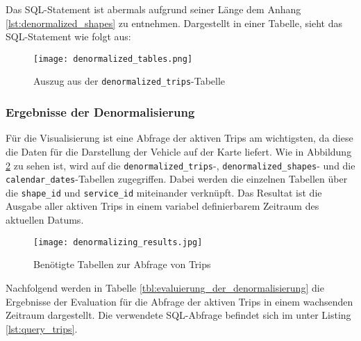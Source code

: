     Das SQL-Statement ist abermals aufgrund seiner Länge dem Anhang \ref{lst:denormalized_shapes} zu entnehmen. Dargestellt in einer Tabelle, sieht das SQL-Statement wie folgt aus:

    \begin{figure}[htbp]
      \begin{center}
        \texttt{[image: denormalized\_tables.png]}
        \caption{Auszug aus der \texttt{denormalized\_trips}-Tabelle}
        \label{fig:denormalized_table}
      \end{center}
    \end{figure}  

    \subsubsection*{Ergebnisse der Denormalisierung}
    \label{ssub:ergebnisse_der_denormalisierung}
      Für die Visualisierung ist eine Abfrage der aktiven Trips am wichtigsten, da diese die Daten für die Darstellung der Vehicle auf der Karte liefert. Wie in Abbildung \ref{fig:denormalizing_results} zu sehen ist, wird auf die \texttt{denormalized\_trips}-, \texttt{denormalized\_shapes}- und die \texttt{calendar\_dates}-Tabellen zugegriffen. Dabei werden die einzelnen Tabellen über die \texttt{shape\_id} und \texttt{service\_id} miteinander verknüpft. Das Resultat ist die Ausgabe aller aktiven Trips in einem variabel definierbarem Zeitraum des aktuellen Datums.

      \begin{figure}[htbp]
        \begin{center}
          \texttt{[image: denormalizing\_results.jpg]}
          \caption{Benötigte Tabellen zur Abfrage von Trips}
          \label{fig:denormalizing_results}
        \end{center}
      \end{figure} 

      Nachfolgend werden in Tabelle \ref{tbl:evaluierung_der_denormalisierung} die Ergebnisse der Evaluation für die Abfrage der aktiven Trips in einem wachsenden Zeitraum dargestellt. Die verwendete SQL-Abfrage befindet sich im  unter Listing \ref{lst:query_trips}.

